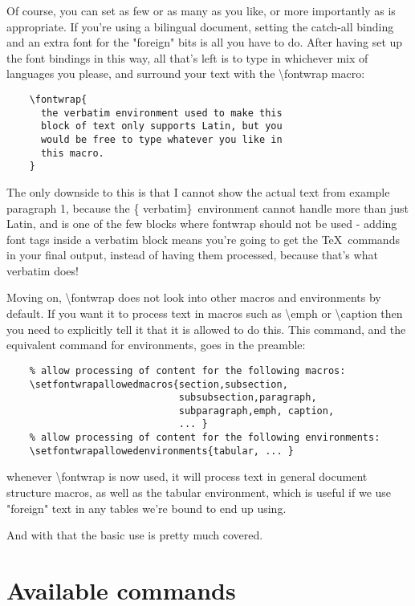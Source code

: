 \documentclass[12pt]{article}
\begin{document}
  Of course, you can set as few or as many as you like, or more importantly as
  is appropriate. If you're using a bilingual document, setting the catch-all
  binding and an extra font for the "foreign" bits is all you have to do. After
  having set up the font bindings in this way, all that's left is to type in
  whichever mix of languages you please, and surround your text with the
  \textbackslash fontwrap macro:
  
  \begin{verbatim}
    \fontwrap{
      the verbatim environment used to make this
      block of text only supports Latin, but you
      would be free to type whatever you like in
      this macro.
    }
  \end{verbatim}
  
  The only downside to this is that I cannot show the actual text from
  example paragraph 1, because the \{ verbatim\}\ environment cannot
  handle more than just Latin, and is one of the few blocks where
  fontwrap should not be used - adding font tags inside a verbatim
  block means you're going to get the \TeX\ commands in your final
  output, instead of having them processed, because that's what
  verbatim does!
  
  Moving on, \textbackslash fontwrap does not look into other macros
  and environments by default. If you want it to process text in macros
  such as \textbackslash emph or \textbackslash caption then you need
  to explicitly tell it that it is allowed to do this. This command,
  and the equivalent command for environments, goes in the preamble:
  
  \begin{verbatim}
    % allow processing of content for the following macros:
    \setfontwrapallowedmacros{section,subsection,
                              subsubsection,paragraph,
                              subparagraph,emph, caption,
                              ... }
    % allow processing of content for the following environments:
    \setfontwrapallowedenvironments{tabular, ... }
  \end{verbatim}
  
  whenever \textbackslash fontwrap is now used, it will process text
  in general document structure macros, as well as the tabular environment,
  which is useful if we use "foreign" text in any tables we're bound to
  end up using.
  
  And with that the basic use is pretty much covered.
  
  \section{Available commands}
  
\end{document}
